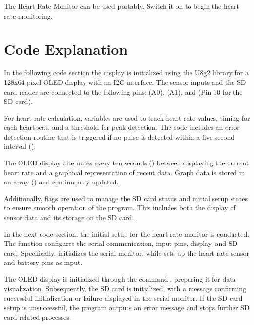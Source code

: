 The Heart Rate Monitor can be used portably. Switch it on to begin the heart rate monitoring.

\section{Code Explanation}

In the following code section the display is initialized using the U8g2 library for a 128x64 pixel OLED display with an I2C interface. The sensor inputs and the SD card reader are connected to the following pins:  (A0),  (A1), and  (Pin 10 for the SD card).


For heart rate calculation, variables are used to track heart rate values, timing for each heartbeat, and a threshold for peak detection. The code includes an error detection routine that is triggered if no pulse is detected within a five-second interval ().

The OLED display alternates every ten seconds () between displaying the current heart rate and a graphical representation of recent data. Graph data is stored in an array () and continuously updated.

Additionally, flags are used to manage the SD card status and initial setup states to ensure smooth operation of the program. This includes both the display of sensor data and its storage on the SD card.


{
	
	
	
}

%

In the next code section, the initial setup for the heart rate monitor is conducted. The function   configures the serial communication, input pins, display, and SD card. Specifically,  initializes the serial monitor, while  sets up the heart rate sensor and battery pins as input.

The OLED display is initialized through the command , preparing it for data visualization. Subsequently, the SD card is initialized, with a message confirming successful initialization or failure displayed in the serial monitor. If the SD card setup is unsuccessful, the program outputs an error message and stops further SD card-related processes.

